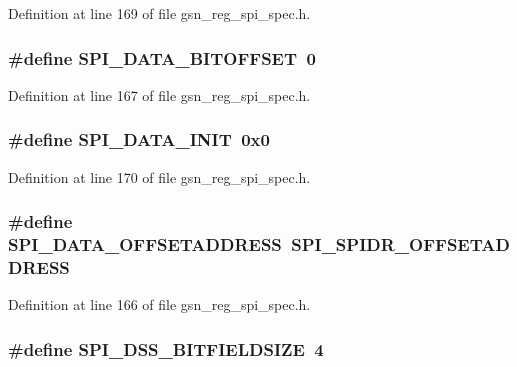 Definition at line 169 of file gsn\_\-reg\_\-spi\_\-spec.h.

\hypertarget{a00573_aa1e62a8cadacab35a4298c3a78719520}{
\subsubsection[{SPI\_\-DATA\_\-BITOFFSET}]{\setlength{\rightskip}{0pt plus 5cm}\#define SPI\_\-DATA\_\-BITOFFSET~0}}
\label{a00573_aa1e62a8cadacab35a4298c3a78719520}


Definition at line 167 of file gsn\_\-reg\_\-spi\_\-spec.h.

\hypertarget{a00573_a95256c5ae1712097e1871ffb6e3fe134}{
\subsubsection[{SPI\_\-DATA\_\-INIT}]{\setlength{\rightskip}{0pt plus 5cm}\#define SPI\_\-DATA\_\-INIT~0x0}}
\label{a00573_a95256c5ae1712097e1871ffb6e3fe134}


Definition at line 170 of file gsn\_\-reg\_\-spi\_\-spec.h.

\hypertarget{a00573_a5df5ae781fac42c083ae9d503b61a202}{
\subsubsection[{SPI\_\-DATA\_\-OFFSETADDRESS}]{\setlength{\rightskip}{0pt plus 5cm}\#define SPI\_\-DATA\_\-OFFSETADDRESS~SPI\_\-SPIDR\_\-OFFSETADDRESS}}
\label{a00573_a5df5ae781fac42c083ae9d503b61a202}


Definition at line 166 of file gsn\_\-reg\_\-spi\_\-spec.h.

\hypertarget{a00573_a5f14106ac3875d61e073b11d46f8ba7e}{
\subsubsection[{SPI\_\-DSS\_\-BITFIELDSIZE}]{\setlength{\rightskip}{0pt plus 5cm}\#define SPI\_\-DSS\_\-BITFIELDSIZE~4}}
\label{a00573_a5f14106ac3875d61e073b11d46f8ba7e}


